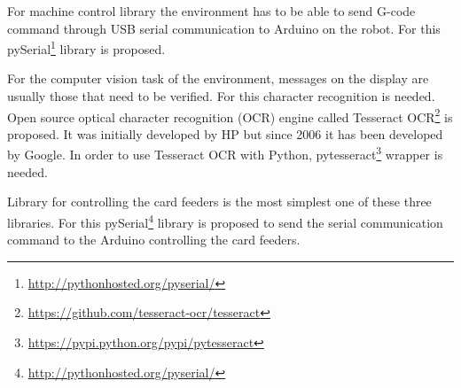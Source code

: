 For machine control library the environment has to be able to send G-code command through USB serial communication to Arduino on the robot. For this pySerial\footnote{\url{http://pythonhosted.org/pyserial/}} library is proposed.

For the computer vision task of the environment, messages on the display are usually those that need to be verified. For this character recognition is needed. Open source optical character recognition (OCR) engine called Tesseract OCR\footnote{\url{https://github.com/tesseract-ocr/tesseract}} is proposed. It was initially developed by HP but since 2006 it has been developed by Google. In order to use Tesseract OCR with Python, pytesseract\footnote{\url{https://pypi.python.org/pypi/pytesseract}} wrapper is needed.

Library for controlling the card feeders is the most simplest one of these three libraries. For this pySerial\footnote{\url{http://pythonhosted.org/pyserial/}} library is proposed to send the serial communication command to the Arduino controlling the card feeders.